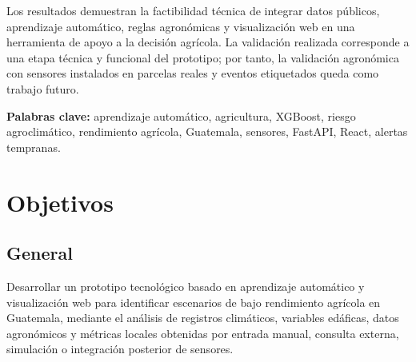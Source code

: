 \documentclass[12pt,letterpaper,oneside]{report}
\begin{document}
Los resultados demuestran la factibilidad técnica de integrar datos públicos, aprendizaje automático, reglas agronómicas y visualización web en una herramienta de apoyo a la decisión agrícola. La validación realizada corresponde a una etapa técnica y funcional del prototipo; por tanto, la validación agronómica con sensores instalados en parcelas reales y eventos etiquetados queda como trabajo futuro.

\textbf{Palabras clave:} aprendizaje automático, agricultura, XGBoost, riesgo agroclimático, rendimiento agrícola, Guatemala, sensores, FastAPI, React, alertas tempranas.

\chapter*{Objetivos}

\section*{General}
Desarrollar un prototipo tecnológico basado en aprendizaje automático y visualización web para identificar escenarios de bajo rendimiento agrícola en Guatemala, mediante el análisis de registros climáticos, variables edáficas, datos agronómicos y métricas locales obtenidas por entrada manual, consulta externa, simulación o integración posterior de sensores.
\end{document}
